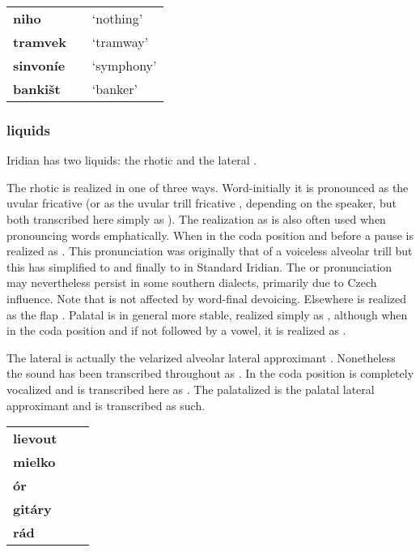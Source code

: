 \begin{center}
	\centering \small
	\begin{tabularx}{0.8\textwidth}{>{\bfseries}YYY}
		niho		&  & `nothing'\\
		tramvek		&&`tramway'\\
		sinvoníe		&&`symphony'\\
		banki\v{s}t	&  & `banker'\\
	\end{tabularx}
\end{center}
\subsubsection{liquids}

Iridian has two liquids: the rhotic  and the lateral .

The rhotic  is realized in one of three ways. Word-initially it is pronounced as the uvular fricative \nt{\textinvscr} (or as the uvular trill fricative \nt{\textraising{\textscr}}, depending on the speaker, but both transcribed here simply as \nt{\rrr}). The realization as \nt{\rrr} is also often used when pronouncing words emphatically. When in the coda position and before a pause  is realized as . This pronunciation was originally that of a voiceless alveolar trill  but this has simplified to  and finally to  in Standard Iridian. The  or  pronunciation may nevertheless persist in some southern dialects, primarily due to Czech influence. Note that  is not affected by word-final devoicing. Elsewhere  is realized as the flap . Palatal  is in general more stable, realized simply as , although when in the coda position and if not followed by a vowel, it is realized as .

The lateral  is actually the velarized alveolar lateral approximant \nt{\textltilde}. Nonetheless the sound has been transcribed throughout as . In the coda position  is completely vocalized and is transcribed here as . The palatalized  is the palatal lateral approximant  and is transcribed as such.

\begin{center}
	\centering \small
	\begin{tabularx}{0.8\textwidth}{>{\bfseries}YYY}
		lievout		&  	& \\
		mielko	 	& 		& \\
		\'or		& 				& \\
		git\'ary	& 		& \\
		r\'ad		& 			& \\
	\end{tabularx}
\end{center}


